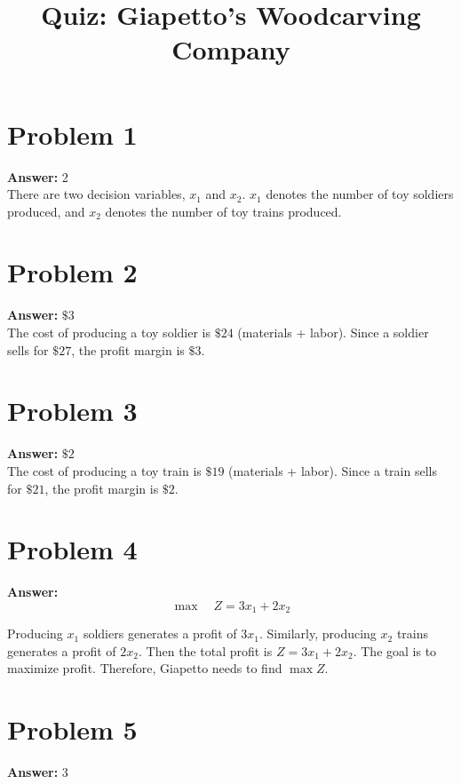 \documentclass[11pt]{article}
\date{}
\title{Quiz: Giapetto's Woodcarving Company}
\begin{document}
\thispagestyle{empty}
\pagestyle{empty}
\section*{Problem 1}
\label{sec:org6fba4a7}

\textbf{Answer:} 2\\

There are two decision variables, \(x_1\) and \(x_2\). \(x_1\) denotes the
number of toy soldiers produced, and \(x_2\) denotes the number of toy trains
produced.
\section*{Problem 2}
\label{sec:org57f9fff}

\textbf{Answer:} \(\$ 3\)\\

The cost of producing a toy soldier is \(\$ 24\) (materials + labor). Since a
soldier sells for \(\$ 27\), the profit margin is \(\$ 3\).
\section*{Problem 3}
\label{sec:orgdd132d5}

\textbf{Answer:} \(\$ 2\)\\

The cost of producing a toy train is \(\$ 19\) (materials + labor). Since a
train sells for \(\$ 21\), the profit margin is \(\$ 2\).
\section*{Problem 4}
\label{sec:org3f9116a}

\textbf{Answer:}
\begin{equation*}
\max\quad Z=3x_1+2x_2
\end{equation*}
\vspace{0.1cm}

Producing \(x_1\) soldiers generates a profit of \(3x_1\). Similarly,
producing \(x_2\) trains generates a profit of \(2x_2\). Then the total
profit is \(Z=3x_1+2x_2\). The goal is to maximize profit. Therefore, Giapetto
needs to find \(\max Z\).
\section*{Problem 5}
\label{sec:orgc58b71e}

\textbf{Answer:} 3\\
\end{document}
